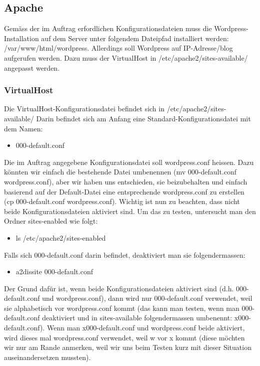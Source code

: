 \documentclass{article}
\begin{document}
	\subsection{Apache}
	Gemäss der im Auftrag erfordlichen Konfigurationsdateien muss die Wordpress-Installation auf dem Server unter folgendem Dateipfad installiert werden: /var/www/html/wordpress.
	Allerdings soll Wordpress auf IP-Adresse/blog aufgerufen werden. Dazu muss der VirtualHost in /etc/apache2/sites-available/ angepasst werden.
	\subsubsection{VirtualHost}
	Die VirtualHost-Konfigurationsdatei befindet sich in /etc/apache2/sites-available/
	Darin befindet sich am Anfang eine Standard-Konfigurationsdatei mit dem Namen:
	\begin{itemize}
		\item 000-default.conf
	\end{itemize}		
	Die im Auftrag angegebene Konfigurationsdatei soll wordpress.conf heissen. Dazu könnten wir einfach die bestehende Datei umbenennen (mv 000-default.conf wordpress.conf), aber wir haben uns entschieden, sie beizubehalten und einfach basierend auf der Default-Datei eine entsprechende wordpress.conf zu erstellen (cp 000-default.conf wordpress.conf). Wichtig ist nun zu beachten, dass nicht beide Konfigurationsdateien aktiviert sind. Um das zu testen, untersucht man den Ordner sites-enabled wie folgt:
	\begin{itemize}
		\item ls /etc/apache2/sites-enabled
	\end{itemize}
	Falls sich  000-default.conf darin befindet, deaktiviert man sie folgendermassen:
	\begin{itemize}
		\item a2dissite  000-default.conf
	\end{itemize}
	Der Grund dafür ist, wenn beide Konfigurationsdateien aktiviert sind (d.h. 000-default.conf und wordpress.conf), dann wird nur 000-default.conf verwendet, weil sie alphabetisch vor wordpress.conf kommt (das kann man testen, wenn man 000-default.conf deaktiviert und in sites-available folgendermassen umbenennt: x000-default.conf). Wenn man x000-default.conf und wordpress.conf beide aktiviert, wird dieses mal wordpress.conf verwendet, weil w vor x kommt (diese möchten wir nur am Rande anmerken, weil wir uns beim Testen kurz mit dieser Situation auseinandersetzen mussten).
	\newline
\end{document}
